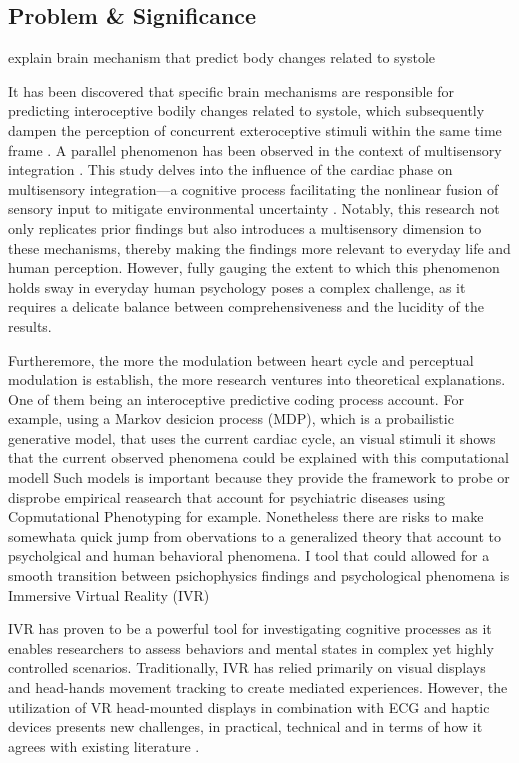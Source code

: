 \documentclass[12pt,oneside,openright]{report}
\begin{document}
\subsection*{Problem \& Significance}
explain brain mechanism that predict body changes related to systole

It has been discovered that specific brain mechanisms are responsible for predicting interoceptive bodily changes related to systole, which subsequently dampen the perception of concurrent exteroceptive stimuli within the same time frame \parencite{esra_p,Grund643, motyka}. A parallel phenomenon has been observed in the context of multisensory integration \parencite{SALTAFOSSI2023108642}. This study delves into the influence of the cardiac phase on multisensory integration—a cognitive process facilitating the nonlinear fusion of sensory input to mitigate environmental uncertainty \parencite{SALTAFOSSI2023108642}. Notably, this research not only replicates prior findings but also introduces a multisensory dimension to these mechanisms, thereby making the findings more relevant to everyday life and human perception. However, fully gauging the extent to which this phenomenon holds sway in everyday human psychology poses a complex challenge, as it requires a delicate balance between comprehensiveness and the lucidity of the results.

Furtheremore, the more the modulation between heart cycle and perceptual modulation is establish, the more research ventures into theoretical explanations. One of them being an interoceptive predictive coding process account. For example, using a Markov desicion process (MDP), which is a probailistic generative model, that uses the current cardiac cycle, an visual stimuli it shows that the current observed phenomena could be explained with this computational modell \parencite{Allen2022} Such models is important because they provide the framework to probe or disprobe empirical reasearch that account for psychiatric diseases using Copmutational Phenotyping for example. Nonetheless there are risks to make somewhata quick jump from obervations to a generalized theory that account to psycholgical and human behavioral phenomena. I tool that could allowed for a smooth transition between psichophysics findings and psychological phenomena is Immersive Virtual Reality (IVR)

IVR has proven to be a powerful tool for investigating cognitive processes as it enables researchers to assess behaviors and mental states in complex yet highly controlled scenarios. Traditionally, IVR has relied primarily on visual displays and head-hands movement tracking to create mediated experiences. However, the utilization of VR head-mounted displays in combination with ECG and haptic devices presents new challenges, in practical, technical and in terms of how it agrees with existing literature \cite*{Klotzsche2023}.
\end{document}
